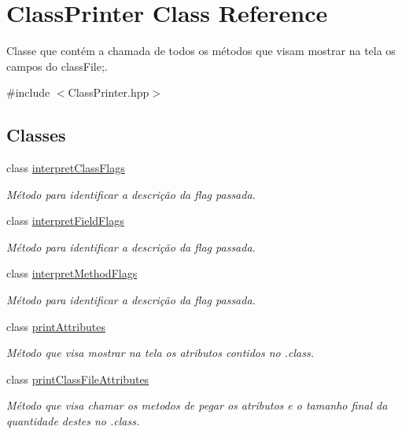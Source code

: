 \hypertarget{classClassPrinter}{}\section{Class\+Printer Class Reference}
\label{classClassPrinter}


Classe que contém a chamada de todos os métodos que visam mostrar na tela os campos do class\+File;.  




{\ttfamily \#include $<$Class\+Printer.\+hpp$>$}

\subsection*{Classes}
\begin{DoxyCompactItemize}
\item 
class \hyperlink{classClassPrinter_1_1interpretClassFlags}{interpret\+Class\+Flags}
\begin{DoxyCompactList}\small\item\em Método para identificar a descrição da flag passada. \end{DoxyCompactList}\item 
class \hyperlink{classClassPrinter_1_1interpretFieldFlags}{interpret\+Field\+Flags}
\begin{DoxyCompactList}\small\item\em Método para identificar a descrição da flag passada. \end{DoxyCompactList}\item 
class \hyperlink{classClassPrinter_1_1interpretMethodFlags}{interpret\+Method\+Flags}
\begin{DoxyCompactList}\small\item\em Método para identificar a descrição da flag passada. \end{DoxyCompactList}\item 
class \hyperlink{classClassPrinter_1_1printAttributes}{print\+Attributes}
\begin{DoxyCompactList}\small\item\em Método que visa mostrar na tela os atributos contidos no .class. \end{DoxyCompactList}\item 
class \hyperlink{classClassPrinter_1_1printClassFileAttributes}{print\+Class\+File\+Attributes}
\begin{DoxyCompactList}\small\item\em Método que visa chamar os metodos de pegar os atributos e o tamanho final da quantidade destes no .class. \end{DoxyCompactList}\item 

\end{DoxyCompactItemize}
